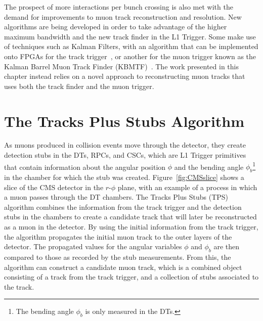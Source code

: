 The prospect of more interactions per bunch crossing is also met with the demand for improvements to muon track reconstruction and resolution.
New algorithms are being developed in order to take advantage of the higher maximum bandwidth and the new track finder in the L1 Trigger.
Some make use of techniques such as Kalman Filters, with an algorithm that can be implemented onto FPGAs for the track trigger~\cite{Amstutz:2194514}, or another for the muon trigger known as the Kalman Barrel Muon Track Finder (KBMTF)~\cite{Bachtis:2648953}.
The work presented in this chapter instead relies on a novel approach to reconstructing muon tracks that uses both the track finder and the muon trigger.

\section{The Tracks Plus Stubs Algorithm}
\label{sec:TPS}

As muons produced in collision events move through the detector, they create detection stubs in the DTs, RPCs, and CSCs, which are L1 Trigger primitives that contain information about the angular position $\phi$ and the bending angle $\phi_b$\footnote{The bending angle $\phi_b$ is only measured in the DTs.} in the chamber for which the stub was created.
Figure~\ref{fig:CMSslice} shows a slice of the CMS detector in the $r$-$\phi$ plane, with an example of a process in which a muon passes through the DT chambers.
The Tracks Plus Stubs (TPS) algorithm combines the information from the track trigger and the detection stubs in the chambers to create a candidate track that will later be reconstructed as a muon in the detector.
By using the initial information from the track trigger, the algorithm propagates the initial muon track to the outer layers of the detector.
The propagated values for the angular variables $\phi$ and $\phi_b$ are then compared to those as recorded by the stub measurements.
From this, the algorithm can construct a candidate muon track, which is a combined object consisting of a track from the track trigger, and a collection of stubs associated to the track.

